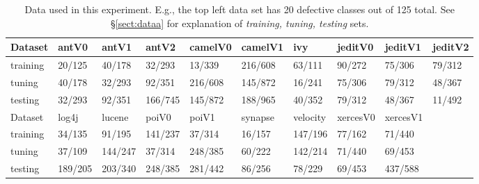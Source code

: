 \documentclass[smallextended]{svjour3}
\newcommand{\tion}[1]{\S\ref{sect:#1}}
\begin{document}


 \begin{table}[!t]

\renewcommand{\baselinestretch}{0.8}
\scriptsize
\centering
  \begin{tabular}{p{0.75cm}p{0.75cm}p{0.75cm}p{0.75cm}p{0.75cm}p{0.75cm}p{0.75cm}p{0.75cm}p{0.75cm}p{0.75cm}}\hline
  Dataset &antV0&antV1&antV2&camelV0&camelV1&ivy&jeditV0&jeditV1&jeditV2
\\\hline
  training &20/125 &40/178 &32/293 &13/339 &216/608 &63/111 &90/272 &75/306 &79/312
\\  tuning  &40/178 &32/293 &92/351 &216/608 &145/872 &16/241 &75/306 &79/312 &48/367
\\  testing &32/293 &92/351 &166/745 &145/872 &188/965 &40/352 &79/312 &48/367 &11/492
\\ \hline
  Dataset &log4j&lucene&poiV0&poiV1&synapse&velocity&xercesV0&xercesV1
\\\hline
  training &34/135 &91/195 &141/237 &37/314 &16/157 &147/196 &77/162 &71/440
\\  tuning  &37/109 &144/247 &37/314 &248/385 &60/222 &142/214 &71/440 &69/453
\\  testing &189/205 &203/340 &248/385 &281/442 &86/256 &78/229 &69/453 &437/588
\\  \end{tabular}

   \caption{Data used in this experiment. 
   E.g., the top left data set has 20 defective classes out of 125 total.
   See \tion{dataa} for explanation of {\em training, tuning, testing} sets.
   }\label{tab:data1}
\end{table} 
\end{document}
